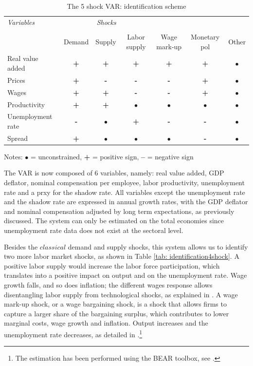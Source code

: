 \documentclass[11pt]{article}
\begin{document}
\begin{table}[!h]
\tiny
\begin{center}
\caption{The 5 shock VAR: identification scheme}
\vskip 0.5cm
\label{tab: identification2}
\begin{tabular}{lcccccc}
\toprule
\textit{Variables} & \multicolumn{3}{c}{\textit{Shocks}} \\ \\[-1ex]
& Demand   & Supply & Labor supply & Wage mark-up & Monetary pol & Other \\

Real value added & \textbf{+} & \textbf{+} & \textbf{+} & \textbf{+} & \textbf{+} & $\bullet$ \\
Prices & \textbf{+} & \textbf{-} & \textbf{-} & \textbf{-} & \textbf{+} & $\bullet$ \\
Wages & \textbf{+} & \textbf{+} & \textbf{-} & \textbf{-} & \textbf{+} & $\bullet$ \\
Productivity & \textbf{+} & \textbf{+} & $\bullet$ & $\bullet$ & $\bullet$ & $\bullet$ \\
Unemployment rate & \textbf{-} & $\bullet$ & \textbf{+} & \textbf{-} & \textbf{-} & $\bullet$ \\
Spread & \textbf{+} & $\bullet$ & $\bullet$ & $\bullet$ & \textbf{-} & $\bullet$ \\
\end{tabular}
\end{center}
\par
{\small \begin{center}Notes: $\bullet$ = unconstrained, \textbf{+} = positive sign,
\textbf{--} = negative sign \end{center}}
\end{table}

The VAR is now composed of 6 variables, namely: real value added, GDP deflator, nominal compensation per employee, labor productivity,  unemployment rate and a prxy for the shadow rate. All variables except the unemployment rate and the shadow rate are expressed in annual growth rates, with the GDP deflator and nominal compensation adjusted by long term expectations, as previously discussed. The system can only be estimated on the total economies since unemployment rate data does not exist at the sectoral level. 

Besides the $classical$ demand and supply shocks, this system allows us to identify two more labor market shocks, as shown in Table \ref{tab: identification4shock}. A positive labor supply would increase the labor force participation, which translates into a positive impact on output and on the unemployment rate. Wage growth falls, and so does inflation; the different wages response allows disentangling labor supply from technological shocks, as explained in \cite{Peersman_Straub_09}. A wage mark-up shock, or a wage bargaining shock, is a shock that allows firms to capture a larger share of the bargaining surplus, which contributes to lower marginal costs, wage growth and inflation. Output increases and the unemployment rate decreases, as detailed in \cite{Foroni_18}.\footnote{The estimation has been performed using the BEAR toolbox, see \cite{Dieppe_2016}.} 
\end{document}
